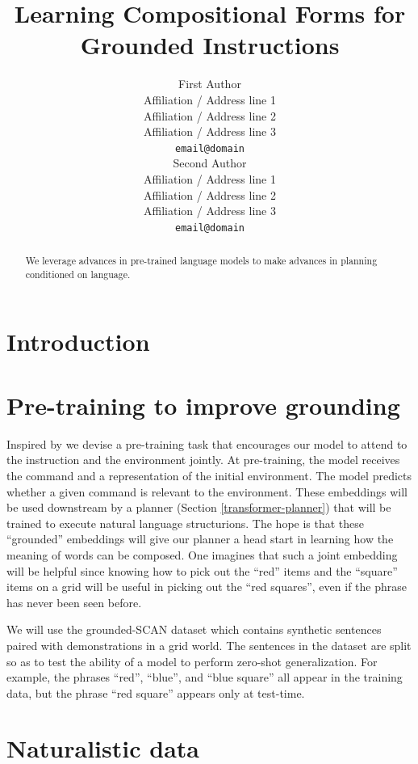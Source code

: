 \documentclass[11pt]{article}
\title{Learning Compositional Forms for Grounded Instructions}
\author{First Author \\
  Affiliation / Address line 1 \\
  Affiliation / Address line 2 \\
  Affiliation / Address line 3 \\
  \texttt{email@domain} \\\And
  Second Author \\
  Affiliation / Address line 1 \\
  Affiliation / Address line 2 \\
  Affiliation / Address line 3 \\
  \texttt{email@domain} \\}
\begin{document}
\maketitle
\begin{abstract}
We leverage advances in pre-trained language models to make advances in planning conditioned on language.
\end{abstract}

\section{Introduction}

\section{Pre-training to improve grounding}
Inspired by \cite{Lu2019ViLBERTPT} we devise a pre-training task that encourages our model to attend to the instruction and the environment jointly. 
%
At pre-training, the model receives the command and a representation of the initial environment. 
%
The model predicts whether a given command is relevant to the environment.
%
These embeddings will be used downstream by a planner (Section \ref{transformer-planner}) that will be trained to execute natural language structurions.
%
The hope is that these ``grounded'' embeddings will give our planner a head start in learning how the meaning of words can be composed.
%
One imagines that such a joint embedding will be helpful since knowing how to pick out the ``red'' items and the ``square''  items on a grid will be useful in picking out the ``red squares'', even if the phrase has never been seen before.

We will use the grounded-SCAN dataset \cite{ruis2020benchmark} which contains synthetic sentences paired with demonstrations in a grid world.
%
The sentences in the dataset are split so as to test the ability of a model to perform zero-shot generalization.
%
For example, the phrases ``red'', ``blue'', and ``blue square'' all appear in the training data, but the phrase ``red square'' appears only at test-time.

\section{Naturalistic data}
\end{document}
